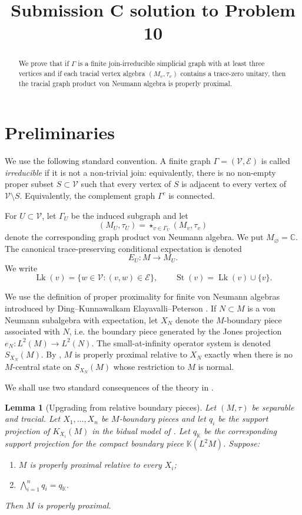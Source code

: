 \documentclass[11pt]{amsart}
\newtheorem{lemma}[theorem]{Lemma}
\theoremstyle{definition}
\newcommand{\V}{\mathcal V}
\newcommand{\E}{\mathcal E}
\newcommand{\Lk}{\operatorname{Lk}}
\newcommand{\St}{\operatorname{St}}
\newcommand{\K}{\mathbb K}
\newcommand{\C}{\mathbb C}
\begin{document}
\title{Submission C solution to Problem 10}
\date{}
\maketitle



\begin{abstract}
We prove that if $\Gamma$ is a finite join-irreducible simplicial graph with at least three vertices and if each tracial vertex algebra $(M_v,\tau_v)$ contains a trace-zero unitary, then the tracial graph product von Neumann algebra is properly proximal.
\end{abstract}

\section{Preliminaries}

We use the following standard convention.  A finite graph $\Gamma=(\V,\E)$ is called \emph{irreducible} if it is not a non-trivial join: equivalently, there is no non-empty proper subset $S\subset \V$ such that every vertex of $S$ is adjacent to every vertex of $\V\setminus S$.  Equivalently, the complement graph $\Gamma^c$ is connected.

For $U\subset \V$, let $\Gamma_U$ be the induced subgraph and let
\[
(M_U,\tau_U)=\mathop{\star}_{v\in \Gamma_U}(M_v,\tau_v)
\]
denote the corresponding graph product von Neumann algebra.  We put $M_\varnothing=\C$.  The canonical trace-preserving conditional expectation is denoted
\[
E_U:M\to M_U.
\]
We write
\[
\Lk(v)=\{w\in \V: (v,w)\in \E\},
\qquad
\St(v)=\Lk(v)\cup\{v\}.
\]

We use the definition of proper proximality for finite von Neumann algebras introduced by Ding--Kunnawalkam Elayavalli--Peterson \cite{DKEP}.  If $N\subset M$ is a von Neumann subalgebra with expectation, let $X_N$ denote the $M$-boundary piece associated with $N$, i.e. the boundary piece generated by the Jones projection $e_N:L^2(M)\to L^2(N)$.  The small-at-infinity operator system is denoted $S_{X_N}(M)$.  By \cite[Theorems 6.2 and 8.5]{DKEP}, $M$ is properly proximal relative to $X_N$ exactly when there is no $M$-central state on $S_{X_N}(M)$ whose restriction to $M$ is normal.

We shall use two standard consequences of the theory in \cite{DKEP}.

\begin{lemma}[Upgrading from relative boundary pieces]\label{lem:upgrade}
Let $(M,\tau)$ be separable and tracial.  Let $X_1,\dots,X_n$ be $M$-boundary pieces and let $q_i$ be the support projection of $K_{X_i}(M)$ in the bidual model of \cite[Section 8]{DKEP}.  Let $q_{\K}$ be the corresponding support projection for the compact boundary piece $\K(L^2M)$.  Suppose:
\begin{enumerate}[label=(\roman*)]
\item $M$ is properly proximal relative to every $X_i$;
\item $\bigwedge_{i=1}^n q_i=q_{\K}$.
\end{enumerate}
Then $M$ is properly proximal.
\end{lemma}
\end{document}
